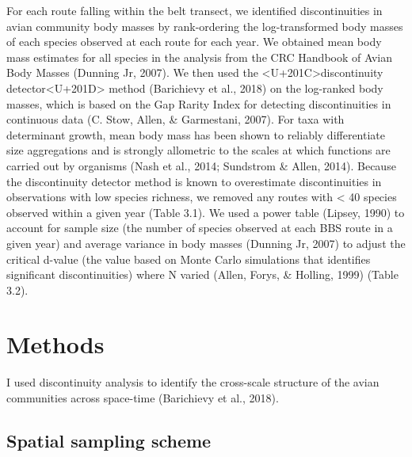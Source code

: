 \documentclass[12pt,twoside,openany]{reedthesis}
\begin{document}
For each route falling within the belt transect, we identified discontinuities in avian community body masses by rank-ordering the log-transformed body masses of each species observed at each route for each year. We obtained mean body mass estimates for all species in the analysis from the CRC Handbook of Avian Body Masses (Dunning Jr, 2007). We then used the \textless U+201C\textgreater discontinuity detector\textless U+201D\textgreater{} method (Barichievy et al., 2018) on the log-ranked body masses, which is based on the Gap Rarity Index for detecting discontinuities in continuous data (C. Stow, Allen, \& Garmestani, 2007). For taxa with determinant growth, mean body mass has been shown to reliably differentiate size aggregations and is strongly allometric to the scales at which functions are carried out by organisms (Nash et al., 2014; Sundstrom \& Allen, 2014). Because the discontinuity detector method is known to overestimate discontinuities in observations with low species richness, we removed any routes with \textless{} 40 species observed within a given year (Table 3.1). We used a power table (Lipsey, 1990) to account for sample size (the number of species observed at each BBS route in a given year) and average variance in body masses (Dunning Jr, 2007) to adjust the critical d-value (the value based on Monte Carlo simulations that identifies significant discontinuities) where N varied (Allen, Forys, \& Holling, 1999) (Table 3.2).

\hypertarget{methods-2}{%
\section{Methods}\label{methods-2}}

I used discontinuity analysis to identify the cross-scale structure of the avian communities across space-time (Barichievy et al., 2018).

\hypertarget{spatial-sampling-scheme}{%
\subsection{Spatial sampling scheme}\label{spatial-sampling-scheme}}
\end{document}
